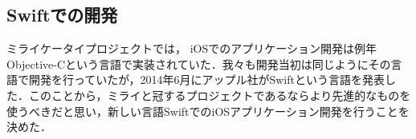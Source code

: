 \subsection{Swiftでの開発}
\par
ミライケータイプロジェクトでは， iOSでのアプリケーション開発は例年Objective-Cという言語で実装されていた．我々も開発当初は同じようにその言語で開発を行っていたが，2014年6月にアップル社がSwiftという言語を発表した．このことから，ミライと冠するプロジェクトであるならより先進的なものを使うべきだと思い，新しい言語SwiftでのiOSアプリケーション開発を行うことを決めた．

